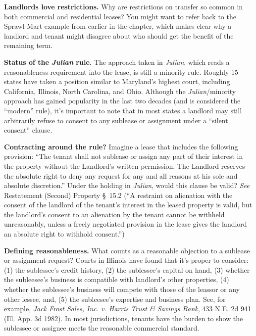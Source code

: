 
\item \textbf{Landlords love restrictions.} Why are restrictions on transfer so
common in both commercial and residential leases?  You might want to refer back
to the Sprawl-Mart example from earlier in the chapter, which makes clear why a
landlord and tenant might disagree about who should get the benefit of the
remaining term.


\item \textbf{Status of the \textit{Julian} rule.} The
approach taken in \textit{Julian}, which reads a reasonableness requirement
into the lease, is still a minority rule.  Roughly 15 states have taken a
position similar to Maryland's highest court, including California, Illinois,
North Carolina, and Ohio.  Although the \textit{Julian}/minority approach has
gained popularity in the last two decades (and is considered the ``modern''
rule), it's important to note that in most states a landlord may still
arbitrarily refuse to consent to any sublease or assignment under a ``silent
consent'' clause.


\item \textbf{Contracting around the rule?} Imagine a lease that includes the
following provision: ``The tenant shall not sublease or assign any part of
their interest in the property without the Landlord's written permission.  The
Landlord reserves the absolute right to deny any request for any and all
reasons at his sole and absolute discretion.''  Under the holding in
\textit{Julian}, would this clause be valid?  \textit{See} Restatement (Second)
Property \S~15.2 (``A restraint on alienation with the consent of the
landlord of the tenant's interest in the leased property is valid, but the
landlord's consent to an alienation by the tenant cannot be withheld
unreasonably, unless a freely negotiated provision in the lease gives the
landlord an absolute right to withhold consent.'')


\item \textbf{Defining reasonableness.} What counts as a reasonable objection to
a sublease or assignment request?  Courts in Illinois have found that it's
proper to consider: (1) the sublessee's credit history, (2) the sublessee's
capital on hand, (3) whether the subleesee's business is compatible with
landlord's other properties, (4) whether the sublessee's business will compete
with those of the leassor or any other lessee, and, (5) the subleesee's
expertise and business plan.  See, for example, \textit{Jack Frost Sales, Inc.
v. Harris Trust \& Savings Bank}, 433 N.E. 2d 941 (Ill. App. 3d 1982). In most
jurisdictions, tenants have the burden to show the sublessee or assignee meets
the reasonable commercial standard.



